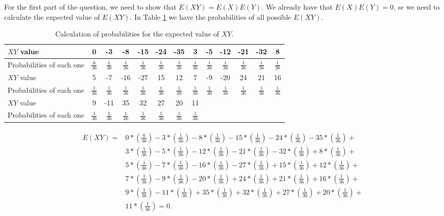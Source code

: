 \documentclass{article}
\begin{document}
For the first part of the question, we need to show that $E(XY) = E(X)E(Y)$. We already have that $E(X)E(Y) = 0$, se we need to calculate the expected value of $E(XY)$. In Table \ref{tab3} we have the probabilities of all possible $E(XY)$.\\

 \begin{table}[]\caption{Calculation of probabilities for the expected value of $XY$.}\label{tab3}
\centering
\begin{tabular}{| p{2cm} | c | c | c | c | c | c | c | c | c | c | c | c | }
\hline
$XY$ value & 0 & -3 & -8 & -15 &-24 & -35 & 3 & -5 & -12 & -21 & -32 & 8  \\
\hline 
Probabilities of each one & $\frac{6}{36}$& $\frac{1}{36}$& $\frac{1}{36}$& $\frac{1}{36}$& $\frac{1}{36}$& $\frac{1}{36}$& $\frac{1}{36}$& $\frac{1}{36}$& $\frac{1}{36}$& $\frac{1}{36}$& $\frac{1}{36}$& $\frac{1}{36}$\\
\hline
\hline
$XY$ value & 5 & -7 & -16 & -27 &15 & 12 & 7 & -9 & -20 & 24 & 21 & 16  \\
\hline 
Probabilities of each one & $\frac{1}{36}$& $\frac{1}{36}$& $\frac{1}{36}$& $\frac{1}{36}$& $\frac{1}{36}$& $\frac{1}{36}$& $\frac{1}{36}$& $\frac{1}{36}$& $\frac{1}{36}$& $\frac{1}{36}$& $\frac{1}{36}$& $\frac{1}{36}$\\
\hline
\hline
$XY$ value & 9 & -11 & 35 & 32 &27 & 20 & 11 &  &  &  &  &   \\
\hline 
Probabilities of each one & $\frac{1}{36}$& $\frac{1}{36}$& $\frac{1}{36}$& $\frac{1}{36}$& $\frac{1}{36}$& $\frac{1}{36}$& $\frac{1}{36}$& & & & & \\
\hline
\end{tabular}
\end{table}


 \begin{eqnarray}
\label{eq6}
\begin{split}
E(XY) = &0* \left(\frac{6}{36}\right) -3* \left(\frac{1}{36}\right) -8* \left(\frac{1}{36}\right) -15* \left(\frac{1}{36}\right) -24* \left(\frac{1}{36}\right) -35* \left(\frac{1}{36}\right) +\\
&3* \left(\frac{1}{36}\right) -5* \left(\frac{1}{36}\right) -12* \left(\frac{1}{36}\right) -21* \left(\frac{1}{36}\right) -32* \left(\frac{1}{36}\right) +8* \left(\frac{1}{36}\right) +\\
&5* \left(\frac{1}{36}\right) -7* \left(\frac{1}{36}\right) -16* \left(\frac{1}{36}\right) -27* \left(\frac{1}{36}\right) +15* \left(\frac{1}{36}\right) +12* \left(\frac{1}{36}\right) +\\
&7* \left(\frac{1}{36}\right) -9* \left(\frac{1}{36}\right) -20* \left(\frac{1}{36}\right) +24* \left(\frac{1}{36}\right) +21* \left(\frac{1}{36}\right) +16* \left(\frac{1}{36}\right) +\\
&9* \left(\frac{1}{36}\right) -11* \left(\frac{1}{36}\right) +35* \left(\frac{1}{36}\right) +32* \left(\frac{1}{36}\right) +27* \left(\frac{1}{36}\right) +20* \left(\frac{1}{36}\right) +\\
&11* \left(\frac{1}{36}\right)   = 0.
\end{split}
\end{eqnarray}
\end{document}
